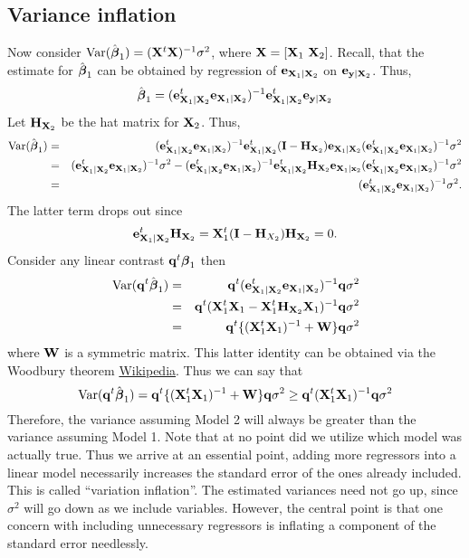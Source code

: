 \subsection{Variance inflation}
Now consider $\mbox{Var}(\hat {\boldsymbol{\beta}}_1) = (\mathbf{X}^t \mathbf{X})^{-1} \sigma^2$, where
$\mathbf{X} = [\mathbf{X}_1 ~ \mathbf{X}_2]$. Recall, that the estimate for $\hat {\boldsymbol{\beta}}_1$ can be
obtained by regression of $\mathbf{e}_{\mathbf{X}_1 | \mathbf{X}_{2}}$ on $\mathbf{e}_{\mathbf{y} | \mathbf{X}_{2}}$. Thus,
$$
\hat {\boldsymbol{\beta}}_1
= (\mathbf{e}_{\mathbf{X}_1 | \mathbf{X}_2}^t \mathbf{e}_{\mathbf{X}_1 | \mathbf{X}_2})^{-1} \mathbf{e}_{\mathbf{X}_1 | \mathbf{X}_2}^t \mathbf{e}_{\mathbf{y} | \mathbf{X}_2}
$$
Let $\mathbf{H}_{\mathbf{X}_2}$ be the hat matrix for $\mathbf{X}_2$. Thus,
\begin{eqnarray*}
\mbox{Var}(\hat {\boldsymbol{\beta}}_1) & = &
(\mathbf{e}_{\mathbf{X}_1 | \mathbf{X}_2}^t \mathbf{e}_{\mathbf{X}_1 | \mathbf{X}_2})^{-1} \mathbf{e}_{\mathbf{X}_1 | \mathbf{X}_2}^t (\mathbf{I} - \mathbf{H}_{\mathbf{X}_2}) \mathbf{e}_{\mathbf{X}_1 | \mathbf{X}_2} (\mathbf{e}_{\mathbf{X}_1 | \mathbf{X}_2}^t \mathbf{e}_{\mathbf{X}_1 | \mathbf{X}_2})^{-1} \sigma^2 \\
& = & (\mathbf{e}_{\mathbf{X}_1 | \mathbf{X}_2}^t \mathbf{e}_{\mathbf{X}_1 | \mathbf{X}_2})^{-1} \sigma^2 -
(\mathbf{e}_{\mathbf{X}_1 | \mathbf{X}_2}^t \mathbf{e}_{\mathbf{X}_1 | \mathbf{X}_2})^{-1} \mathbf{e}_{\mathbf{X}_1 | \mathbf{X}_2}^t \mathbf{H}_{\mathbf{X}_2} \mathbf{e}_{\mathbf{X}_1 | \mathbf{x}_2}(\mathbf{e}_{\mathbf{X}_1 | \mathbf{X}_2}^t \mathbf{e}_{\mathbf{X}_1 | \mathbf{X}_2})^{-1} \sigma^2 \\
& =  &  (\mathbf{e}_{\mathbf{X}_1 | \mathbf{X}_2}^t \mathbf{e}_{\mathbf{X}_1 | \mathbf{X}_2})^{-1} \sigma^2.
\end{eqnarray*}
The latter term drops out since 
$$
\mathbf{e}_{\mathbf{X}_1 | \mathbf{X}_2}^t \mathbf{H}_{\mathbf{X}_2} = \mathbf{X}_1^t (\mathbf{I} - \mathbf{H}_{X_2}) \mathbf{H}_{\mathbf{X}_2} = 0.
$$
Consider any linear contrast $\mathbf{q}^t \boldsymbol{\beta}_1$ then
\begin{eqnarray*}
\mbox{Var}(\mathbf{q}^t \hat {\boldsymbol{\beta}}_1)& = &\mathbf{q}^t (\mathbf{e}_{\mathbf{X}_1 | \mathbf{X}_2}^t \mathbf{e}_{\mathbf{X}_1 | \mathbf{X}_2})^{-1} \mathbf{q} \sigma^2 \\
& = & \mathbf{q}^t  (\mathbf{X}_1^t\mathbf{X}_1 - \mathbf{X}_1^t \mathbf{H}_{\mathbf{X}_2} \mathbf{X}_1)^{-1} \mathbf{q} \sigma^2 \\
& = &\mathbf{q}^t \{(\mathbf{X}_1^t\mathbf{X}_1)^{-1} + \mathbf{W}\}\mathbf{q} \sigma^2
\end{eqnarray*}
where $\mathbf{W}$ is a symmetric matrix. This latter identity can be obtained via the Woodbury theorem
\href{https://en.wikipedia.org/wiki/Woodbury_matrix_identity}{Wikipedia}.
Thus we can say that
$$
\mbox{Var}(\mathbf{q}^t \hat {\boldsymbol{\beta}}_1) = \mathbf{q}^t \{(\mathbf{X}_1^t\mathbf{X}_1)^{-1} + \mathbf{W}\}\mathbf{q} \sigma^2 
\geq \mathbf{q}^t(\mathbf{X}_1^t\mathbf{X}_1)^{-1} \mathbf{q} \sigma^2
$$
Therefore, the variance assuming Model 2 will always be greater than the variance assuming Model 1.
Note that at no point did we utilize which model was actually true. Thus we arrive at an
essential point, adding more regressors into a linear model necessarily increases the
standard error of the ones already included. This is called ``variation inflation''. The
estimated variances need not go up, since $\sigma^2$ will go down as we include variables. 
However, the central point is that one concern with including unnecessary regressors
is inflating a component of the standard error needlessly. 

